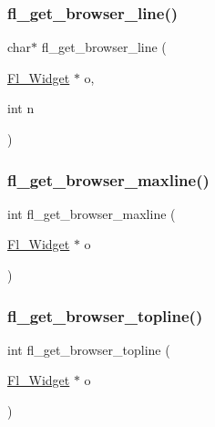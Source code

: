 \subsubsection{\texorpdfstring{fl\+\_\+get\+\_\+browser\+\_\+line()}{fl\_get\_browser\_line()}}
{\footnotesize\ttfamily char$\ast$ fl\+\_\+get\+\_\+browser\+\_\+line (\begin{DoxyParamCaption}\item[{\hyperlink{class_fl___widget}{Fl\+\_\+\+Widget} $\ast$}]{o,  }\item[{int}]{n }\end{DoxyParamCaption})\hspace{0.3cm}{\ttfamily [inline]}}

\mbox{\label{forms_8_h_a8f31f51d65aa08144bb5f051a0bed3e5}} 
\subsubsection{\texorpdfstring{fl\+\_\+get\+\_\+browser\+\_\+maxline()}{fl\_get\_browser\_maxline()}}
{\footnotesize\ttfamily int fl\+\_\+get\+\_\+browser\+\_\+maxline (\begin{DoxyParamCaption}\item[{\hyperlink{class_fl___widget}{Fl\+\_\+\+Widget} $\ast$}]{o }\end{DoxyParamCaption})\hspace{0.3cm}{\ttfamily [inline]}}

\mbox{\label{forms_8_h_a484b024bc702a6d637817a7b3c223c45}} 
\subsubsection{\texorpdfstring{fl\+\_\+get\+\_\+browser\+\_\+topline()}{fl\_get\_browser\_topline()}}
{\footnotesize\ttfamily int fl\+\_\+get\+\_\+browser\+\_\+topline (\begin{DoxyParamCaption}\item[{\hyperlink{class_fl___widget}{Fl\+\_\+\+Widget} $\ast$}]{o }\end{DoxyParamCaption})\hspace{0.3cm}{\ttfamily [inline]}}

